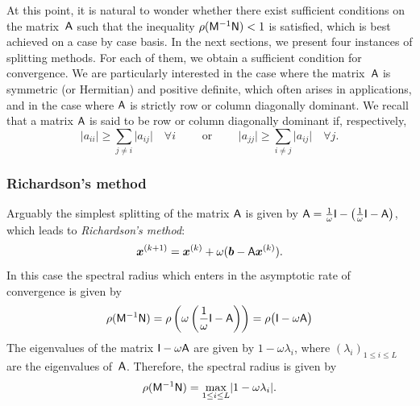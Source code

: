 At this point,
it is natural to wonder whether there exist sufficient conditions on the matrix~$\mathsf A$ such that the inequality $\rho(\mathsf M^{-1} \mathsf N) < 1$ is satisfied,
which is best achieved on a case by case basis.
In the next sections,
we present four instances of splitting methods.
For each of them,
we obtain a sufficient condition for convergence.
We are particularly interested in the case where the matrix~$\mathsf A$ is symmetric (or Hermitian) and positive definite,
which often arises in applications,
and in the case where $\mathsf A$ is strictly row or column diagonally dominant.
We recall that a matrix $\mathsf A$ is said to be row or column diagonally dominant
if, respectively,
\[
    \lvert a_{ii} \rvert \geq \sum_{j \neq i} \lvert a_{ij} \rvert \quad \forall i
    \qquad \text{ or } \qquad
    \lvert a_{jj} \rvert \geq \sum_{i \neq j} \lvert a_{ij} \rvert \quad \forall j.
\]

\subsubsection{Richardson's method}%
\label{ssub:richardson_s_method}

Arguably the simplest splitting of the matrix $\mathsf A$ is given by $\mathsf A = \frac{1}{\omega} \mathsf I - \bigl(\frac{1}{\omega} \mathsf I - \mathsf A\bigr)$,
which leads to \emph{Richardson's method}:
\begin{equation}
    \label{eq:linear_richardson}
    \mathbf{\boldsymbol{x}}^{(k+1)} = \mathbf{\boldsymbol{x}}^{(k)} +  \omega (\mathbf{\boldsymbol{b}} - \mathsf A \mathbf{\boldsymbol{x}}^{(k)}).
\end{equation}
In this case the spectral radius which enters in the asymptotic rate of convergence is given by
\[
    \rho(\mathsf M^{-1} \mathsf N)
    = \rho\left(\omega \left(\frac{1}{\omega} \mathsf I - \mathsf A\right) \right)
    = \rho\bigl( \mathsf I - \omega \mathsf A \bigr)
\]
The eigenvalues of the matrix $\mathsf I - \omega \mathsf A$ are given by $1 - \omega \lambda_i$,
where $(\lambda_i)_{1 \leq i \leq L}$ are the eigenvalues of~$\mathsf A$.
Therefore, the spectral radius is given by
\[
    \rho(\mathsf M^{-1} \mathsf N)
    = \max_{1 \leq i \leq L} \lvert1  - \omega \lambda_i\rvert.
\]

